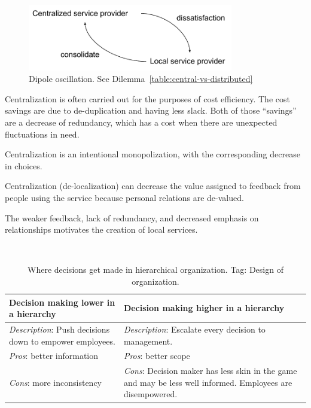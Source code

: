 \begin{figure}[ht]
    \centering
    \includegraphics[width=0.8\textwidth]{images/dilemma_centralization-vs-distributed.pdf}
    \caption{Dipole oscillation. See Dilemma~\ref{table:central-vs-distributed}}
    \label{fig:central-vs-distributed}
\end{figure}

Centralization is often carried out for the purposes of cost efficiency. The cost savings are due to de-duplication and having less slack. Both of those ``savings'' are a decrease of redundancy, which has a cost when there are unexpected fluctuations in need. 

Centralization is an intentional monopolization, with the corresponding decrease in choices. 

Centralization (de-localization) can decrease the value assigned to feedback from people using the service because personal relations are de-valued. 

The weaker feedback, lack of redundancy, and decreased emphasis on relationships motivates the creation of local services. 

\ \\

\begin{center}
\begin{table}[ht]
\begin{tabular}{ | m{\dilemmatablewidth}| m{\dilemmatablewidth} | } 
  \hline
  \textbf{Decision making lower in a hierarchy} &
  \textbf{Decision making higher in a hierarchy} \\
  \hline
  \textit{Description}: Push decisions down to empower employees. &
  \textit{Description}: Escalate every decision to management. \\  
  \hline
  \textit{Pros}: better information &
  \textit{Pros}: better scope \\
  \hline
  \textit{Cons}: more inconsistency & 
  \textit{Cons}: Decision maker has less skin in the game and may be less well informed. Employees are disempowered. \\
  \hline
\end{tabular}
\caption{Where decisions get made in hierarchical organization.
{\tiny Tag: Design of organization.}
}
\label{table:decisions_low-vs-high}
\end{table}
\end{center}


